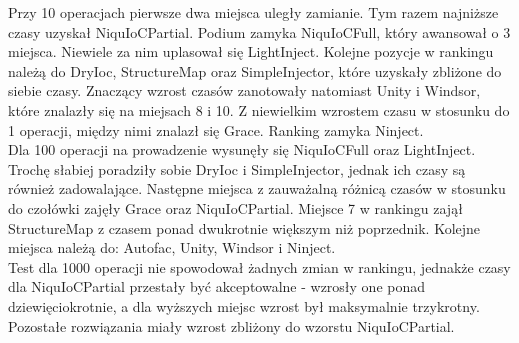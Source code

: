 \documentclass[12pt]{article}
\begin{document}
Przy 10 operacjach pierwsze dwa miejsca uległy zamianie. Tym razem najniższe czasy uzyskał NiquIoCPartial. Podium zamyka NiquIoCFull, który awansował o 3 miejsca. Niewiele za nim uplasował się LightInject. Kolejne pozycje w rankingu należą do DryIoc, StructureMap oraz SimpleInjector, które uzyskały zbliżone do siebie czasy. Znaczący wzrost czasów zanotowały natomiast Unity i Windsor, które znalazły się na miejsach 8 i 10. Z niewielkim wzrostem czasu w stosunku do 1 operacji, między nimi znalazł się Grace. Ranking zamyka Ninject.\\
Dla 100 operacji na prowadzenie wysunęły się NiquIoCFull oraz LightInject. Trochę słabiej poradziły sobie DryIoc i SimpleInjector, jednak ich czasy są również zadowalające. Następne miejsca z zauważalną różnicą czasów w stosunku do czołówki zajęły Grace oraz NiquIoCPartial. Miejsce 7 w rankingu zajął StructureMap z czasem ponad dwukrotnie większym niż poprzednik. Kolejne miejsca należą do: Autofac, Unity, Windsor i Ninject.\\
Test dla 1000 operacji nie spowodował żadnych zmian w rankingu, jednakże czasy dla NiquIoCPartial przestały być akceptowalne - wzrosły one ponad dziewięciokrotnie, a dla wyższych miejsc wzrost był maksymalnie trzykrotny. Pozostałe rozwiązania miały wzrost zbliżony do wzorstu NiquIoCPartial.
\end{document}
